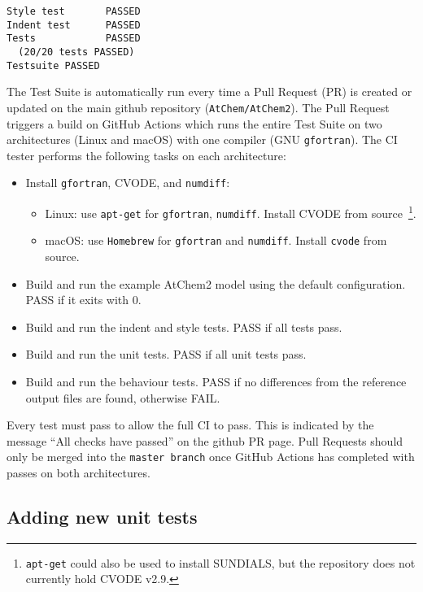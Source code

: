 \begin{verbatim}
Style test       PASSED
Indent test      PASSED
Tests            PASSED
  (20/20 tests PASSED)
Testsuite PASSED
\end{verbatim}

The Test Suite is automatically run every time a Pull Request (PR) is
created or updated on the main github repository (\texttt{AtChem/AtChem2}).
The Pull Request triggers a build on GitHub Actions which runs the entire
Test Suite on two architectures (Linux and macOS) with one compiler
(GNU \texttt{gfortran}). The CI tester performs the following tasks on
each architecture:

\begin{itemize}
\item Install \texttt{gfortran}, CVODE, and \texttt{numdiff}:
  \begin{itemize}
  \item Linux: use \texttt{apt-get} for \texttt{gfortran},
    \texttt{numdiff}. %
    Install CVODE from source~\footnote{\texttt{apt-get} could
      also be used to install SUNDIALS, but the repository does not
      currently hold CVODE v2.9.}.
  \item macOS: use \texttt{Homebrew} for \texttt{gfortran} and
    \texttt{numdiff}. Install \texttt{cvode} from source.
  \end{itemize}
\item Build and run the example AtChem2 model using the default
  configuration. PASS if it exits with 0.
\item Build and run the indent and style tests. PASS if all tests pass.
\item Build and run the unit tests. PASS if all unit tests pass.
\item Build and run the behaviour tests. PASS if no differences from
  the reference output files are found, otherwise FAIL.
\end{itemize}

Every test must pass to allow the full CI to pass. This is indicated
by the message ``All checks have passed'' on the github PR page. Pull
Requests should only be merged into the \texttt{master\ branch} once
GitHub Actions has completed with passes on both architectures.

\subsection{Adding new unit tests} \label{subsec:adding-new-unit-tests}


